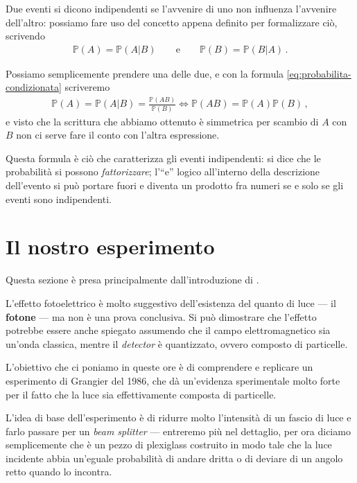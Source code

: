 \documentclass{article}
\begin{document}
Due eventi si dicono indipendenti se l'avvenire di uno non influenza l'avvenire dell'altro: possiamo fare uso del concetto appena definito per formalizzare ciò, scrivendo 
%
\begin{align}
\mathbb{P}(A) = \mathbb{P}(A | B) 
\qquad \text{e} \qquad
\mathbb{P}(B) = \mathbb{P}(B | A) 
\,.
\end{align}

Possiamo semplicemente prendere una delle due, e con la formula \eqref{eq:probabilita-condizionata} scriveremo 
%
\begin{align} \label{eq:probabilita-indipenenti}
\mathbb{P}(A) = \mathbb{P}(A | B) = \frac{\mathbb{P}(AB)}{\mathbb{P}(B)}
\iff
\mathbb{P}(AB) = \mathbb{P}(A) \mathbb{P}(B)
\,,
\end{align}
%
e visto che la scrittura che abbiamo ottenuto è simmetrica per scambio di \(A\) con \(B\) non ci serve fare il conto con l'altra espressione.

Questa formula è ciò che caratterizza gli eventi indipendenti: si dice che le probabilità si possono \emph{fattorizzare}; l'``e'' logico all'interno della descrizione dell'evento si può portare fuori e diventa un prodotto fra numeri se e solo se gli eventi sono indipendenti.

\section{Il nostro esperimento}

Questa sezione è presa principalmente dall'introduzione di \textcite{thornObservingQuantumBehavior2004}.

L'effetto fotoelettrico è molto suggestivo dell'esistenza del quanto di luce --- il \textbf{fotone} --- ma non è una prova conclusiva. Si può dimostrare che l'effetto potrebbe essere anche spiegato assumendo che il campo elettromagnetico sia un'onda classica, mentre il \emph{detector} è quantizzato, ovvero composto di particelle.

L'obiettivo che ci poniamo in queste ore è di comprendere e replicare un esperimento di Grangier del 1986, che dà un'evidenza sperimentale molto forte per il fatto che la luce sia effettivamente composta di particelle.

L'idea di base dell'esperimento è di ridurre molto l'intensità di un fascio di luce e farlo passare per un \emph{beam splitter} --- entreremo più nel dettaglio, per ora diciamo semplicemente che è un pezzo di plexiglass costruito in modo tale che la luce incidente abbia un'eguale probabilità di andare dritta o di deviare di un angolo retto quando lo incontra.
\end{document}
